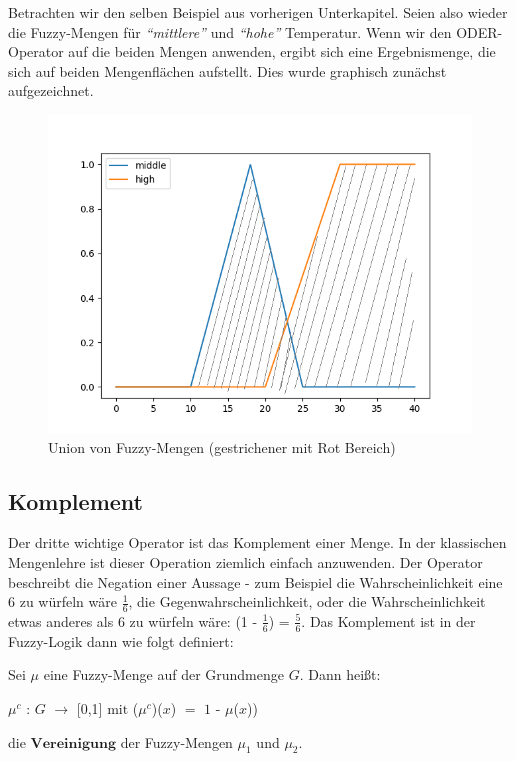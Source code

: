 Betrachten wir den selben Beispiel aus vorherigen Unterkapitel. Seien also wieder die Fuzzy-Mengen für \textit{``mittlere''} und \textit{``hohe''} Temperatur. Wenn wir den ODER-Operator auf die beiden Mengen anwenden, ergibt sich eine Ergebnismenge, die sich auf beiden Mengenflächen aufstellt. Dies wurde graphisch zunächst aufgezeichnet.

\begin{figure}[htbp]
	\centering
	\includegraphics[scale=0.5]{images/oder_mid_high_temp.png}
	\caption{Union von Fuzzy-Mengen (gestrichener mit Rot Bereich)}
\end{figure}\label{high_low_temp_union}

\subsection{Komplement}

Der dritte wichtige Operator ist das Komplement einer Menge. In der klassischen Mengenlehre ist dieser Operation ziemlich einfach anzuwenden. Der Operator beschreibt die Negation einer Aussage - zum Beispiel die Wahrscheinlichkeit eine 6 zu würfeln wäre $\frac{1}{6}$, die Gegenwahrscheinlichkeit, oder die Wahrscheinlichkeit etwas anderes als 6 zu würfeln wäre: (1 - $\frac{1}{6}$) = $\frac{5}{6}$. Das Komplement ist in der Fuzzy-Logik dann wie folgt definiert: 

\begin{definition}
	Sei $\mu$ eine Fuzzy-Menge auf der Grundmenge $G$. Dann heißt:
	\begin{center}
		$\mu^c$  : $G$ $\rightarrow$ [0,1] $\text{mit}$  ($\mu^c$)($x$) $=$ $1$ - $\mu$($x$)) 
	\end{center}
	die $\textbf{Vereinigung}$ der Fuzzy-Mengen $\mu_1$ und $\mu_2$.
\end{definition}


